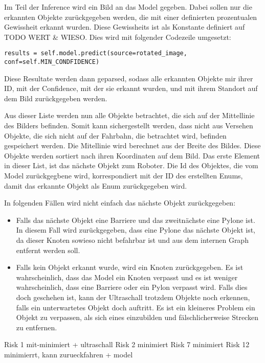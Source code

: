 Im Teil der Inference wird ein Bild an das Model gegeben. Dabei sollen nur die erkannten Objekte zurückgegeben werden, die mit einer definierten prozentualen Gewissheit erkannt wurden. Diese Gewissheits ist als Konstante definiert auf TODO WERT \& WIESO. Dies wird mit folgender Codezeile umgesetzt:
\begin{verbatim}
results = self.model.predict(source=rotated_image, conf=self.MIN_CONDFIDENCE)
\end{verbatim}

Diese Resultate werden dann geparsed, sodass alle erkannten Objekte mir ihrer ID, mit der Confidence, mit der sie erkannt wurden, und mit ihrem Standort auf dem Bild zurückgegeben werden.

Aus dieser Liste werden nun alle Objekte betrachtet, die sich auf der Mittellinie des Bilders befinden. Somit kann sichergestellt werden, dass nicht aus Versehen Objekte, die sich nicht auf der Fahrbahn, die betrachtet wird, befinden gespeichert werden. Die Mitellinie wird berechnet aus der Breite des Bildes. Diese Objekte werden sortiert nach ihren Koordinaten auf dem Bild. Das erste Element in dieser List, ist das nächste Objekt zum Roboter. Die Id des Objektes, die vom Model zurückgegbene wird, korrespondiert mit der ID des erstellten Enums, damit das erkannte Objekt als Enum zurückgegeben wird.

In folgenden Fällen wird nicht einfach das nächste Objekt zurückgegeben:

\begin{itemize}
    \item Falls das nächste Objekt eine Barriere und das zweitnächste eine Pylone ist. In diesem Fall wird zurückgegeben, dass eine Pylone das nächste Objekt ist, da dieser Knoten sowieso nicht befahrbar ist und aus dem internen Graph entfernt werden soll.
    \item Falls kein Objekt erkannt wurde, wird ein Knoten zurückgegeben. Es ist wahrscheinlich, dass das Model ein Knoten verpasst und es ist weniger wahrscheinlich, dass eine Barriere oder ein Pylon verpasst wird. Falls dies doch geschehen ist, kann der Ultraschall trotzdem Objekte noch erkennen, falls ein unterwartetes Objekt doch auftritt. Es ist ein kleineres Problem ein Objekt zu verpassen, als sich eines einzubilden und fälschlicherweise Strecken zu entfernen.
\end{itemize}

Risk 1 mit-minimiert + ultraschall
Risk 2 minimiert
Risk 7 minimiert
Risk 12 minimierrt, kann zurueckfahren + model

